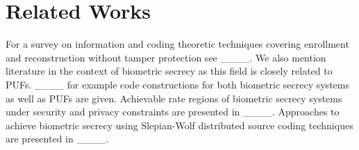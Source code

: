 \section{Related Works}
For a survey on information and coding theoretic techniques covering enrollment and reconstruction without tamper protection see ____. We also mention literature in the context of biometric secrecy as this field is closely related to PUFs. ____ for example code constructions for both biometric secrecy systems as well as PUFs are given. Achievable rate regions of biometric secrecy systems under security and privacy constraints are presented in ____. Approaches to achieve biometric secrecy using Slepian-Wolf distributed source coding techniques are presented in ____.